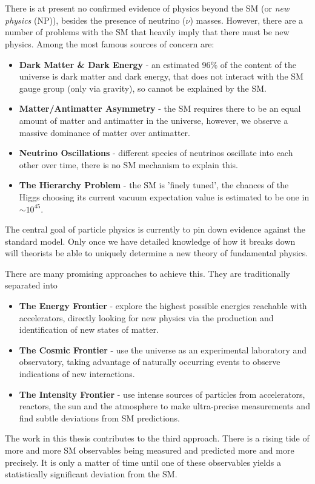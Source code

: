 \\ \\
There is at present no confirmed evidence of physics beyond the SM (or {\it{new physics}} (NP)), besides the presence of neutrino ($\nu$) masses. However, there are a number of problems with the SM that heavily imply that there must be new physics. Among the most famous sources of concern are:
\begin{itemize}
\item
  {\bf{Dark Matter \& Dark Energy}} - an estimated 96\% of the content of the universe is dark matter and dark energy, that does not interact with the SM gauge group (only via gravity), so cannot be explained by the SM.
\item
  {\bf{Matter/Antimatter Asymmetry}} - the SM requires there to be an equal amount of matter and antimatter in the universe, however, we observe a massive dominance of matter over antimatter.
\item
  {\bf{Neutrino Oscillations}} - different species of neutrinos oscillate into each other over time, there is no SM mechanism to explain this.
\item
  {\bf{The Hierarchy Problem}} - the SM is 'finely tuned', the chances of the Higgs choosing its current vacuum expectation value is estimated to be one in $\sim 10^{45}$.
\end{itemize}

The central goal of particle physics is currently to pin down evidence against the standard model. Only once we have detailed knowledge of how it breaks down will theorists be able to uniquely determine a new theory of fundamental physics.

There are many promising approaches to achieve this. They are traditionally separated into
\begin{itemize}
\item
  {\bf{The Energy Frontier}} - explore the highest possible energies reachable with accelerators, directly looking for new physics via the production and identification of new states of matter.
\item
  {\bf{The Cosmic Frontier}} - use the universe as an experimental laboratory and observatory,  taking advantage of naturally occurring events to observe indications of new interactions.
\item
  {\bf{The Intensity Frontier}} - use intense sources of particles from accelerators, reactors, the sun and the atmosphere to make ultra-precise measurements and find subtle deviations from SM predictions.
\end{itemize}
The work in this thesis contributes to the third approach. There is a rising tide of more and more SM observables being measured and predicted more and more precisely. It is only a matter of time until one of these observables yields a statistically significant deviation from the SM.

